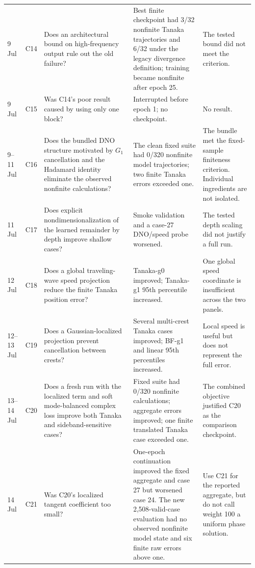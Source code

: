 \documentclass[11pt]{article}
\begin{document}
{\begin{longtable}{p{}p{}p{}p{}p{}}
9 Jul & C14
& Does an architectural bound on high-frequency output rule out the old
failure?
& Best finite checkpoint had 3/32 nonfinite Tanaka trajectories and 6/32 under
the legacy divergence definition; training became nonfinite after epoch 25.
& The tested bound did not meet the criterion. \\

9 Jul & C15
& Was C14's poor result caused by using only one block?
& Interrupted before epoch 1; no checkpoint.
& No result. \\

9--11 Jul & C16
& Does the bundled DNO structure motivated by $G_1$ cancellation and the
Hadamard identity eliminate the observed nonfinite calculations?
& The clean fixed suite had 0/320 nonfinite model trajectories; two finite
Tanaka errors exceeded one.
& The bundle met the fixed-sample finiteness criterion.  Individual ingredients
are not isolated. \\

11 Jul & C17
& Does explicit nondimensionalization of the learned remainder by depth improve
shallow cases?
& Smoke validation and a case-27 DNO/speed probe worsened.
& The tested depth scaling did not justify a full run. \\

12 Jul & C18
& Does a global traveling-wave speed projection reduce the finite Tanaka
position error?
& Tanaka-g0 improved; Tanaka-g1 95th percentile increased.
& One global speed coordinate is insufficient across the two panels. \\

12--13 Jul & C19
& Does a Gaussian-localized projection prevent cancellation between crests?
& Several multi-crest Tanaka cases improved; BF-g1 and linear 95th percentiles
increased.
& Local speed is useful but does not represent the full error. \\

13--14 Jul & C20
& Does a fresh run with the localized term and soft mode-balanced complex loss
improve both Tanaka and sideband-sensitive cases?
& Fixed suite had 0/320 nonfinite calculations; aggregate errors improved; one
finite translated Tanaka case exceeded one.
& The combined objective justified C20 as the comparison checkpoint. \\

14 Jul & C21
& Was C20's localized tangent coefficient too small?
& One-epoch continuation improved the fixed aggregate and case 27 but worsened
case 24.  The new 2,508-valid-case evaluation had no observed nonfinite model
state and six finite raw errors above one.
& Use C21 for the reported aggregate, but do not call weight 100 a uniform
phase solution. \\


\end{longtable}}
\end{document}
